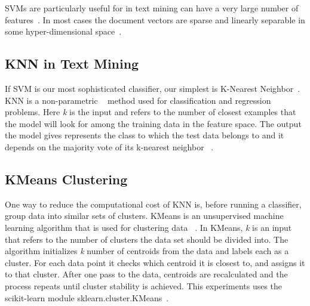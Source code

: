 \documentclass[sigconf]{acmart}
\theoremstyle{break}
\begin{document}
    SVMs are particularly useful for  in text mining can have a very large number of features~\cite{gamon2004sentiment}.  In most cases the document vectors are sparse and linearly separable in some hyper-dimensional space~\cite{joachims1998text}.
    
    \subsection{KNN in Text Mining}
    \label{sssec:KNN in Text Mining}
    If SVM is our most sophisticated classifier, our simplest is K-Nearest Neighbor~\cite{zhang2007ml}. KNN is a non-parametric ~\cite{goldberger2005neighbourhood} method used for classification and regression problems. Here {\em k} is the input and refers to the number of closest examples that the model will look for among the training data in the feature space. The output the model gives represents the class to which the test data belongs to and it depends on the majority vote of its k-nearest neighbor ~\cite{mihalcea2006corpus}.
  
    
    \subsection{KMeans Clustering}
    \label{sssec:K-Means Clustering}
    One way to reduce the computational cost of KNN is, before running a classifier,  group data into similar sets of clusters. KMeans is an unsupervised machine learning algorithm that is used for clustering data ~\cite{jain2010data}. In KMeans, {\em k} is an input that refers to the number of clusters the data set should be divided into. The algorithm initializes {\em k} number of centroids from the data and labels each as a cluster. For each data point it checks which centroid it is closest to, and assigns it to that cluster. After one pass to the data, centroids are recalculated and the process repeats until cluster stability is achieved. 
    This experiments uses the scikit-learn module   sklearn.cluster.KMeans~\cite{pedregosa2011scikit}.
    
\end{document}
